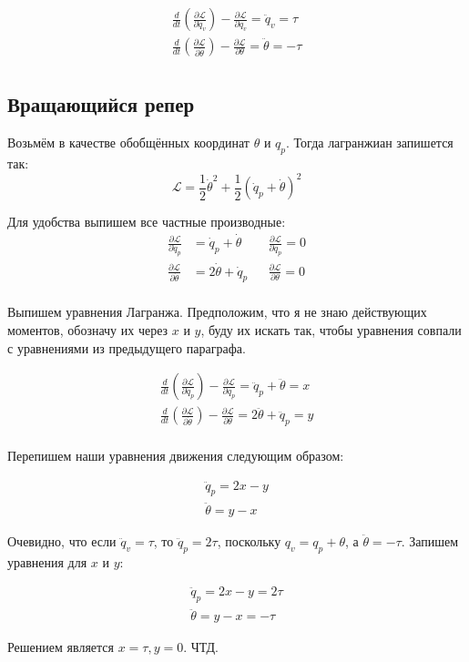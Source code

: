 \documentclass{article}
\begin{document}
\begin{align*}
\frac{d}{dt}\left(\frac{\partial\mathcal L}{\partial\dot q_v}\right) - \frac{\partial\mathcal L}{\partial q_v} = \ddot q_v = \tau\\
\frac{d}{dt}\left(\frac{\partial\mathcal L}{\partial\dot \theta}\right) - \frac{\partial\mathcal L}{\partial \theta} = \ddot\theta = -\tau\\
\end{align*}

\subsection{Вращающийся репер}

Возьмём в качестве обобщённых координат $\theta$ и $q_p$. Тогда лагранжиан запишется так:
$$
\mathcal{L} = \frac{1}{2} \dot \theta^2 + \frac{1}{2}(\dot q_p+\dot\theta)^2
$$

Для удобства выпишем все частные производные:
\begin{align*}
\frac{\partial\mathcal L}{\partial\dot q_p} &= \dot q_p + \dot\theta && \frac{\partial\mathcal L}{\partial q_p} = 0\\
\frac{\partial\mathcal L}{\partial\dot\theta} &= 2\dot\theta +\dot q_p &&  \frac{\partial\mathcal L}{\partial\theta} = 0\\
\end{align*}

Выпишем уравнения Лагранжа. Предположим, что я не знаю действующих моментов, обозначу их через $x$ и $y$, буду их искать так, чтобы уравнения совпали с уравнениями из предыдущего параграфа.

\begin{align*}
\frac{d}{dt}\left(\frac{\partial\mathcal L}{\partial\dot q_p}\right) - \frac{\partial\mathcal L}{\partial q_p}= \ddot q_p + \ddot\theta = x\\
\frac{d}{dt}\left(\frac{\partial\mathcal L}{\partial\dot \theta}\right) - \frac{\partial\mathcal L}{\partial \theta}= 2\ddot\theta +  \ddot q_p   = y\\
\end{align*}

Перепишем наши уравнения движения следующим образом:

\begin{align*}
\ddot q_p = 2x - y\\
\ddot\theta = y - x
\end{align*}

Очевидно, что если $\ddot q_v = \tau$, то $\ddot q_p = 2\tau$, поскольку $q_v = q_p + \theta$, а $\ddot\theta = -\tau$. Запишем уравнения для $x$ и $y$:

\begin{align*}
\ddot q_p = 2x - y = 2\tau\\
\ddot\theta = y - x = -\tau
\end{align*}

Решением является $x=\tau, y=0$. ЧТД.

\fi
\end{document}
